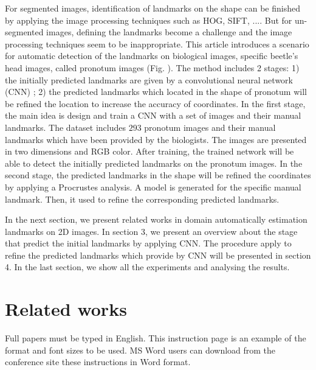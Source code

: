 \documentclass[10pt]{article}
\begin{document}
For segmented images, identification of landmarks on the shape can be finished by applying the image processing techniques such as HOG\cite{}, SIFT\cite{}, .... But for un-segmented images, defining the landmarks become a challenge and the image processing techniques seem to be inappropriate. This article introduces a scenario for automatic detection of the landmarks on biological images, specific beetle's head images, called pronotum images (Fig. ). The method includes 2 stages: 1) the initially predicted landmarks are given by a convolutional neural network (CNN) \cite{}; 2) the predicted landmarks which located in the shape of pronotum will be refined the location to increase the accuracy of coordinates. In the first stage, the main idea is design and train a CNN with a set of images and their manual landmarks. The dataset includes $293$ pronotum images and their manual landmarks which have been provided by the biologists. The images are presented in two dimensions and RGB color. After training, the trained network will be able to detect the initially predicted landmarks on the pronotum images. In the second stage, the predicted landmarks in the shape will be refined the coordinates by applying a Procrustes analysis\cite{}. A model is generated for the specific manual landmark. Then, it used to refine the corresponding predicted landmarks.

In the next section, we present related works in domain automatically estimation landmarks on 2D images. In section 3, we present an overview about the stage that predict the initial landmarks by applying CNN. The procedure apply to refine the predicted landmarks which provide by CNN will be presented in section 4. In the last section, we show all the experiments and analysing the results.

\section{Related works}
Full papers must be typed in English. This instruction page is
an example of the format and font sizes to be used. MS Word
users can download from the conference site these
instructions in Word format.
\end{document}
